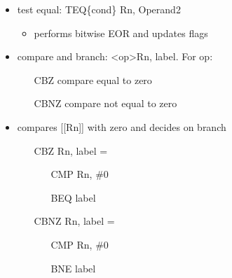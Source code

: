 \begin{itemize}
    \item test equal: TEQ\{cond\} Rn, Operand2
    \begin{itemize}
      \item performs bitwise EOR and updates flags
    \end{itemize}
    \item compare and branch: \textless op\textgreater Rn, label. For op:
    \begin{itemize}
      \item[CBZ] compare equal to zero
      \item[CBNZ] compare not equal to zero
    \end{itemize}
    \item compares [[Rn]] with zero and decides on branch
    \begin{itemize}
      \item[CBZ] Rn, label =
      \begin{itemize}
        \item[CMP] Rn, \#0
        \item[BEQ] label
      \end{itemize}
      \item[CBNZ] Rn, label =
      \begin{itemize}
        \item[CMP] Rn, \#0
        \item[BNE] label
      \end{itemize}
    \end{itemize}
  \end{itemize}
